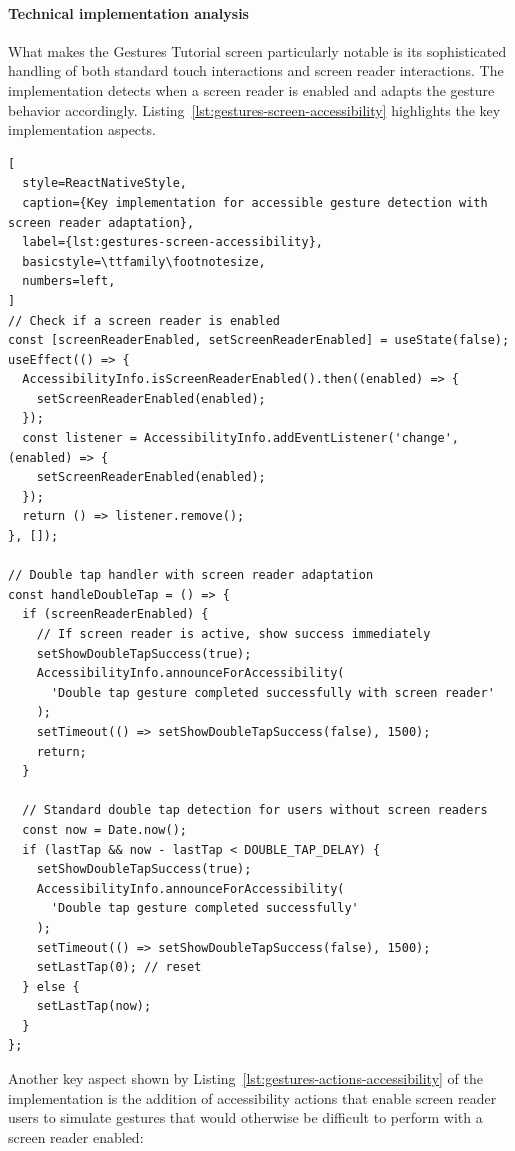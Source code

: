 \paragraph{Technical implementation analysis}

What makes the Gestures Tutorial screen particularly notable is its sophisticated handling of both standard touch interactions and screen reader interactions. The implementation detects when a screen reader is enabled and adapts the gesture behavior accordingly. Listing~\ref{lst:gestures-screen-accessibility} highlights the key implementation aspects.

\begin{lstlisting}[
  style=ReactNativeStyle,
  caption={Key implementation for accessible gesture detection with screen reader adaptation},
  label={lst:gestures-screen-accessibility},
  basicstyle=\ttfamily\footnotesize,
  numbers=left,
]
// Check if a screen reader is enabled
const [screenReaderEnabled, setScreenReaderEnabled] = useState(false);
useEffect(() => {
  AccessibilityInfo.isScreenReaderEnabled().then((enabled) => {
    setScreenReaderEnabled(enabled);
  });
  const listener = AccessibilityInfo.addEventListener('change', (enabled) => {
    setScreenReaderEnabled(enabled);
  });
  return () => listener.remove();
}, []);

// Double tap handler with screen reader adaptation
const handleDoubleTap = () => {
  if (screenReaderEnabled) {
    // If screen reader is active, show success immediately
    setShowDoubleTapSuccess(true);
    AccessibilityInfo.announceForAccessibility(
      'Double tap gesture completed successfully with screen reader'
    );
    setTimeout(() => setShowDoubleTapSuccess(false), 1500);
    return;
  }

  // Standard double tap detection for users without screen readers
  const now = Date.now();
  if (lastTap && now - lastTap < DOUBLE_TAP_DELAY) {
    setShowDoubleTapSuccess(true);
    AccessibilityInfo.announceForAccessibility(
      'Double tap gesture completed successfully'
    );
    setTimeout(() => setShowDoubleTapSuccess(false), 1500);
    setLastTap(0); // reset
  } else {
    setLastTap(now);
  }
};
\end{lstlisting}
\FloatBarrier

Another key aspect shown by Listing~\ref{lst:gestures-actions-accessibility} of the implementation is the addition of accessibility actions that enable screen reader users to simulate gestures that would otherwise be difficult to perform with a screen reader enabled:

